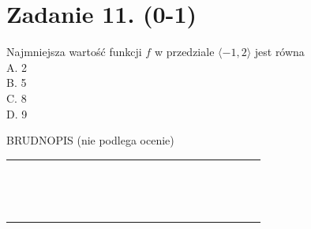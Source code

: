 \documentclass[10pt]{article}
\begin{document}
\section*{Zadanie 11. (0-1)}
Najmniejsza wartość funkcji \(f\) w przedziale \(\langle-1,2\rangle\) jest równa\\
A. 2\\
B. 5\\
C. 8\\
D. 9

BRUDNOPIS (nie podlega ocenie)

\begin{center}
\begin{tabular}{|c|c|c|c|c|c|c|c|c|c|c|c|c|c|c|c|c|c|c|c|c|c|c|}
\hline
 &  &  &  &  &  &  &  &  &  &  &  &  &  &  &  &  &  &  &  &  &  &  \\
\hline
 &  &  &  &  &  &  &  &  &  &  &  &  &  &  &  &  &  &  &  &  &  &  \\
\hline
 &  &  &  &  &  &  &  &  &  &  &  &  &  &  &  &  &  &  &  &  &  &  \\
\hline
 &  &  &  &  &  &  &  &  &  &  &  &  &  &  &  &  &  &  &  &  &  &  \\
\hline
 &  &  &  &  &  &  &  &  &  &  &  &  &  &  &  &  &  &  &  &  &  &  \\
\hline
 &  &  &  &  &  &  &  &  &  &  &  &  &  &  &  &  &  &  &  &  &  &  \\
\hline
 &  &  &  &  &  &  &  &  &  &  &  &  &  &  &  &  &  &  &  &  &  &  \\
\hline
 &  &  &  &  &  &  &  &  &  &  &  &  &  &  &  &  &  &  &  &  &  &  \\
\hline
 &  &  &  &  &  &  &  &  &  &  &  &  &  &  &  &  &  &  &  &  &  &  \\
\hline
 &  &  &  &  &  &  &  &  &  &  &  &  &  &  &  &  &  &  &  &  &  &  \\
\hline
 &  &  &  &  &  &  &  &  &  &  &  &  &  &  &  &  &  &  &  &  &  &  \\
\hline
 &  &  &  &  &  &  &  &  &  &  &  &  &  &  &  &  &  &  &  &  &  &  \\
\hline
 &  &  &  &  &  &  &  &  &  &  &  &  &  &  &  &  &  &  &  &  &  &  \\
\hline
 &  &  &  &  &  &  &  &  &  &  &  &  &  &  &  &  &  &  &  &  &  &  \\
\hline
 &  &  &  &  &  &  &  &  &  &  &  &  &  &  &  &  &  &  &  &  &  &  \\
\hline
 &  &  &  &  &  &  &  &  &  &  &  &  &  &  &  &  &  &  &  &  &  &  \\

\end{tabular}
\end{center}
\end{document}
